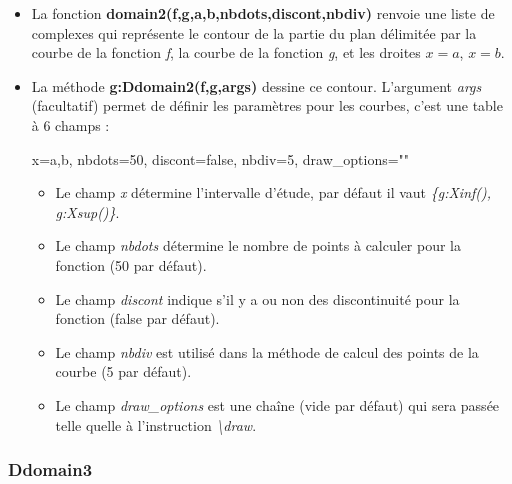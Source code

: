 \begin{itemize}
    \item La fonction \textbf{domain2(f,g,a,b,nbdots,discont,nbdiv)} renvoie une liste de complexes qui représente le contour de la partie du plan délimitée par la courbe de la fonction \emph{f}, la courbe de la fonction \emph{g}, et les droites \(x=a\), \(x=b\).
    
    \item La méthode \textbf{g:Ddomain2(f,g,args)} dessine ce contour. L'argument \emph{args} (facultatif) permet de définir les paramètres pour les courbes, c'est une table à 6 champs : 

\begin{TeXcode}
    { x={a,b}, nbdots=50, discont=false, nbdiv=5, draw_options="" }
\end{TeXcode}

\begin{itemize}
  \item Le champ \emph{x} détermine l'intervalle d'étude, par défaut il vaut \emph{\{g:Xinf(), g:Xsup()\}}.
  \item Le champ \emph{nbdots} détermine le nombre de points à calculer pour la fonction (50 par défaut).
  \item Le champ \emph{discont} indique s'il y a ou non des discontinuité pour la fonction (false par défaut).
  \item Le champ \emph{nbdiv} est utilisé dans la méthode de calcul des points de la courbe (5 par défaut).
  \item Le champ \emph{draw\_options} est une chaîne (vide par défaut) qui sera passée telle quelle à l'instruction \emph{\textbackslash draw}.
\end{itemize}
\end{itemize}
  
\subsubsection{Ddomain3}

